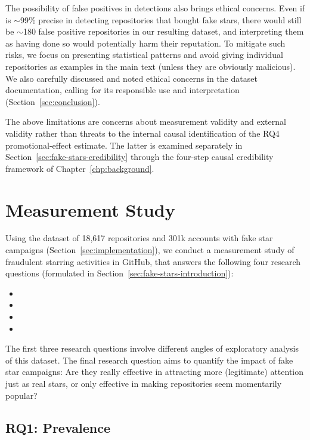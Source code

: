 The possibility of false positives in \SystemName detections also brings ethical concerns.
Even if \SystemName is $\sim$99\% precise in detecting repositories that bought fake stars, there would still be $\sim$180 false positive repositories in our resulting dataset, and interpreting them as having done so would potentially harm their reputation.
To mitigate such risks, we focus on presenting statistical patterns and avoid giving individual repositories as examples in the main text (unless they are obviously malicious).
We also carefully discussed and noted ethical concerns in the dataset documentation, calling for its responsible use and interpretation  (Section~\ref{sec:conclusion}).

The above limitations are concerns about measurement validity and external validity rather than threats to the internal causal identification of the RQ4 promotional-effect estimate.
The latter is examined separately in Section~\ref{sec:fake-stars-credibility} through the four-step causal credibility framework of Chapter~\ref{chp:background}.


\section{Measurement Study}
\label{sec:measurement-study}

Using the dataset of 18,617 repositories and 301k accounts with fake star campaigns (Section~\ref{sec:implementation}), we conduct a measurement study of fraudulent starring activities in GitHub, that answers the following four research questions (formulated in Section~\ref{sec:fake-stars-introduction}):
\begin{itemize}[leftmargin=15pt]
    \item \RQOne
    \item \RQTwo
    \item \RQThree
    \item \RQFour
\end{itemize}
The first three research questions involve different angles of exploratory analysis of this dataset.
The final research question aims to quantify the impact of fake star campaigns: Are they really effective in attracting more (legitimate) attention just as real stars, or only effective in making repositories seem momentarily popular?

\subsection{RQ1: Prevalence}
\label{sec:rq1}

